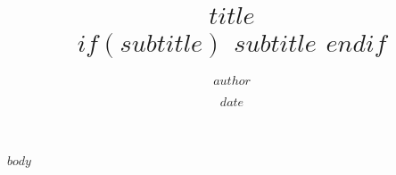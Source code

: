 \documentclass[a4paper,twocolumn,openany,nodeprecatedcode]{dndbook}
\title{$title$ \\
$if(subtitle)$
\large $subtitle$
$endif$
}
\author{$author$}
\date{$date$}
\begin{document}
    \frontmatter

    \maketitle

    $body$
\end{document}
